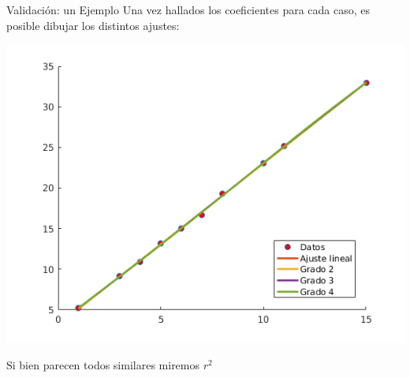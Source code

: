 \documentclass[xcolor=svgnames]{beamer} %
\theoremstyle{plain}
\theoremstyle{definition}
\begin{document}
\begin{frame}{Validación: un Ejemplo}
Una vez hallados los coeficientes para cada caso, es posible dibujar los distintos ajustes:

\begin{minipage}{.7\linewidth}
\centering
\includegraphics[width=\linewidth]{EjemploValidacion/Ajustes.png}

\end{minipage}
\begin{minipage}{.25\linewidth}
\pause Si bien parecen todos similares miremos $r^2$
\end{minipage}

\end{frame}
\end{document}
